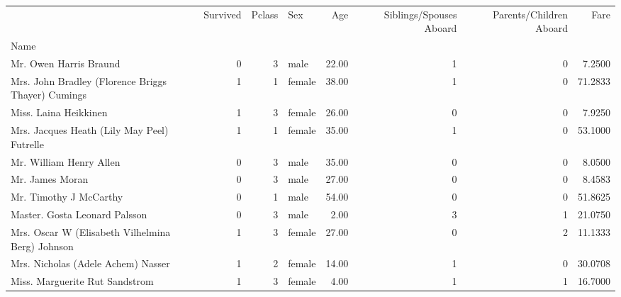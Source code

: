 \begin{tabular}{lrrlrrrr}
\toprule
{} &  Survived &  Pclass &     Sex &    Age &  Siblings/Spouses Aboard &  Parents/Children Aboard &      Fare \\
Name                                               &           &         &         &        &                          &                          &           \\
\midrule
Mr. Owen Harris Braund                             &         0 &       3 &    male &  22.00 &                        1 &                        0 &    7.2500 \\
Mrs. John Bradley (Florence Briggs Thayer) Cumings &         1 &       1 &  female &  38.00 &                        1 &                        0 &   71.2833 \\
Miss. Laina Heikkinen                              &         1 &       3 &  female &  26.00 &                        0 &                        0 &    7.9250 \\
Mrs. Jacques Heath (Lily May Peel) Futrelle        &         1 &       1 &  female &  35.00 &                        1 &                        0 &   53.1000 \\
Mr. William Henry Allen                            &         0 &       3 &    male &  35.00 &                        0 &                        0 &    8.0500 \\
Mr. James Moran                                    &         0 &       3 &    male &  27.00 &                        0 &                        0 &    8.4583 \\
Mr. Timothy J McCarthy                             &         0 &       1 &    male &  54.00 &                        0 &                        0 &   51.8625 \\
Master. Gosta Leonard Palsson                      &         0 &       3 &    male &   2.00 &                        3 &                        1 &   21.0750 \\
Mrs. Oscar W (Elisabeth Vilhelmina Berg) Johnson   &         1 &       3 &  female &  27.00 &                        0 &                        2 &   11.1333 \\
Mrs. Nicholas (Adele Achem) Nasser                 &         1 &       2 &  female &  14.00 &                        1 &                        0 &   30.0708 \\
Miss. Marguerite Rut Sandstrom                     &         1 &       3 &  female &   4.00 &                        1 &                        1 &   16.7000 \\

\end{tabular}
